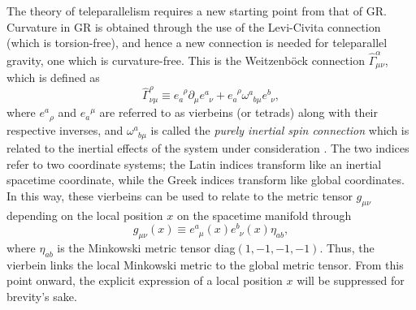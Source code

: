 \documentclass[prl,floatfix,showpacs,twocolumn,preprintnumbers,amsmath,amssymb,superscriptaddress]{revtex4}
\newcommand{\udt}[3]{#1^{#2}_{\phantom{#2}#3}}
\newcommand{\dut}[3]{#1_{#2}^{\phantom{#2}#3}}
\begin{document}
The theory of teleparallelism requires a new starting point from that of GR. Curvature in GR is obtained through the use of the Levi-Civita connection (which is torsion-free), and hence a new connection is needed for teleparallel gravity, one which is curvature-free. This is the Weitzenb\"{o}ck connection $\widehat{\Gamma}^{\alpha}_{\mu\nu}$, which is defined as
\begin{equation}\label{eq:weitzenbockdef}
\widehat{\Gamma}^{\rho}_{\nu\mu} \equiv \dut{e}{a}{\rho}\partial_\mu \udt{e}{a}{\nu} + \dut{e}{a}{\rho}\udt{\omega}{a}{b\mu}\udt{e}{b}{\nu},
\end{equation}
where ${e^a}_\rho$ and ${e_a}^\mu$ are referred to as vierbeins (or tetrads) along with their respective inverses, and $\udt{\omega}{a}{b\mu}$ is called the \textit{purely inertial spin connection} which is related to the inertial effects of the system under consideration \cite{aldrovandi2012teleparallel,Krssak:2015lba}. The two indices refer to two coordinate systems; the Latin indices transform like an inertial spacetime coordinate, while the Greek indices transform like global coordinates. In this way, these vierbeins can be used to relate to the metric tensor $g_{\mu\nu}$ depending on the local position $x$ on the spacetime manifold through
\begin{equation}
g_{\mu\nu}\left(x\right)\equiv \udt{e}{a}{\mu}\left(x\right)\udt{e}{b}{\nu}\left(x\right)\eta_{ab},
\end{equation}
where $\eta_{ab}$ is the Minkowski metric tensor diag$(1,-1,-1,-1)$. Thus, the vierbein links the local Minkowski metric to the global metric tensor. From this point onward, the explicit expression of a local position $x$ will be suppressed for brevity's sake. 
\end{document}
